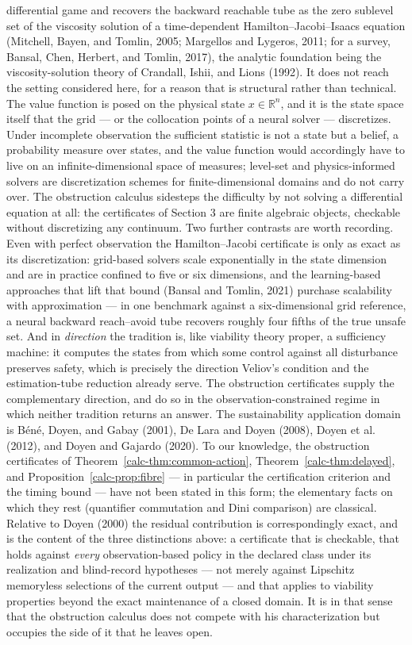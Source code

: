 \documentclass[10pt,twocolumn]{article}
\theoremstyle{definition}
\begin{document}
differential game and recovers the backward reachable tube as the zero sublevel set of the
viscosity solution of a time-dependent Hamilton--Jacobi--Isaacs equation (Mitchell, Bayen,
and Tomlin, 2005; Margellos and Lygeros, 2011; for a survey, Bansal, Chen, Herbert, and
Tomlin, 2017), the analytic foundation being the viscosity-solution theory of Crandall, Ishii,
and Lions (1992).  It does not reach the setting considered here, for a reason that is
structural rather than technical.  The value function is posed on the physical state
\(x \in \mathbb{R}^{n}\), and it is the state space itself that the grid --- or the
collocation points of a neural solver --- discretizes.  Under incomplete observation the
sufficient statistic is not a state but a belief, a probability measure over states, and the
value function would accordingly have to live on an infinite-dimensional space of measures;
level-set and physics-informed solvers are discretization schemes for finite-dimensional
domains and do not carry over.  The obstruction calculus sidesteps the difficulty by not
solving a differential equation at all: the certificates of Section 3 are finite algebraic
objects, checkable without discretizing any continuum.  Two further contrasts are worth
recording.  Even with perfect observation the Hamilton--Jacobi certificate is only as exact
as its discretization: grid-based solvers scale exponentially in the state dimension and are
in practice confined to five or six dimensions, and the learning-based approaches that lift
that bound (Bansal and Tomlin, 2021) purchase scalability with approximation --- in one
benchmark against a six-dimensional grid reference, a neural backward reach--avoid tube
recovers roughly four fifths of the true unsafe set.  And in \emph{direction} the tradition
is, like viability theory proper, a sufficiency machine: it computes the states from which
some control against all disturbance preserves safety, which is precisely the direction
Veliov's condition and the estimation-tube reduction already serve.  The obstruction
certificates supply the complementary direction, and do so in the observation-constrained
regime in which neither tradition returns an answer. The sustainability application domain is B\'en\'e, Doyen, and Gabay (2001), De Lara and Doyen (2008), Doyen et al. (2012), and Doyen and Gajardo (2020). To our knowledge, the obstruction certificates of Theorem~\ref{calc-thm:common-action}, Theorem~\ref{calc-thm:delayed}, and Proposition~\ref{calc-prop:fibre} --- in particular the certification criterion and the timing bound --- have not been stated in this form; the elementary facts on which they rest (quantifier commutation and Dini comparison) are classical. Relative to Doyen (2000) the residual contribution is correspondingly exact, and is the content of the three distinctions above: a certificate that is checkable, that holds against \emph{every} observation-based policy in the declared class under its realization and blind-record hypotheses --- not merely against Lipschitz memoryless selections of the current output --- and that applies to viability properties beyond the exact maintenance of a closed domain. It is in that sense that the obstruction calculus does not compete with his characterization but occupies the side of it that he leaves open.
\end{document}
